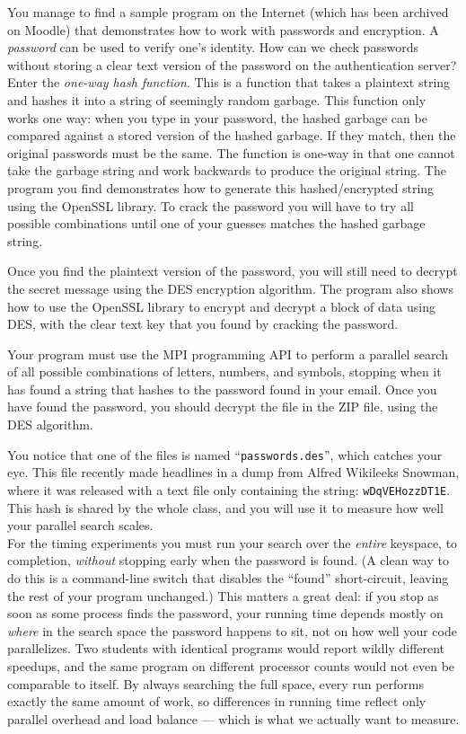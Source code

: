 \documentclass[11pt]{article}
\begin{document}
You manage to find a sample program on the Internet (which has been archived on
Moodle) that demonstrates how to work with passwords and encryption. A {\em
  password} can be used to verify one's identity. How can we check passwords
without storing a clear text version of the password on the authentication
server? Enter the {\em one-way hash function}. This is a function that takes a
plaintext string and hashes it into a string of seemingly random garbage. This
function only works one way: when you type in your password, the hashed garbage
can be compared against a stored version of the hashed garbage. If they match,
then the original passwords must be the same. The function is one-way in that
one cannot take the garbage string and work backwards to produce the original
string. The program you find demonstrates how to generate this hashed/encrypted
string using the OpenSSL library. To crack the password you will have to try
all possible combinations until one of your guesses matches the hashed garbage
string.

Once you find the plaintext version of the password, you will still need to
decrypt the secret message using the DES encryption algorithm. The program also
shows how to use the OpenSSL library to encrypt and decrypt a block of data
using DES, with the clear text key that you found by cracking the password.

Your program must use the MPI programming API to perform a parallel search of
all possible combinations of letters, numbers, and symbols, stopping when it has
found a string that hashes to the password found in your email. Once you have
found the password, you should decrypt the file in the ZIP file, using the DES
algorithm.\\


You notice that one of the files is named ``{\tt passwords.des}'', which catches
your eye. This file recently made headlines in a dump from Alfred Wikileeks
Snowman, where it was released with a text file only containing the string:
{\tt wDqVEHozzDT1E}. This hash is shared by the whole class, and you will use it
to measure how well your parallel search scales.\\

For the timing experiments you must run your search over the {\em entire}
keyspace, to completion, {\em without} stopping early when the password is
found. (A clean way to do this is a command-line switch that disables the
``found'' short-circuit, leaving the rest of your program unchanged.) This
matters a great deal: if you stop as soon as some process finds the password,
your running time depends mostly on {\em where} in the search space the password
happens to sit, not on how well your code parallelizes. Two students with
identical programs would report wildly different speedups, and the same program
on different processor counts would not even be comparable to itself. By always
searching the full space, every run performs exactly the same amount of work, so
differences in running time reflect only parallel overhead and load balance ---
which is what we actually want to measure.\\
\end{document}
